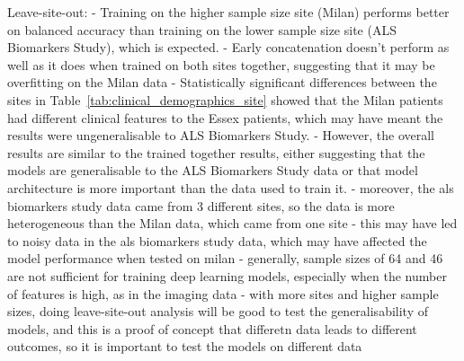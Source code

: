 



Leave-site-out:
- Training on the higher sample size site (Milan) performs better on balanced accuracy than training on the lower sample size site (ALS Biomarkers Study), which is expected.
- Early concatenation doesn't perform as well as it does when trained on both sites together, suggesting that it may be overfitting on the Milan data
- Statistically significant differences between the sites in Table~\ref{tab:clinical_demographics_site} showed that the Milan patients had different clinical features to the Essex patients, which may have meant the results were ungeneralisable to ALS Biomarkers Study.
- However, the overall results are similar to the trained together results, either suggesting that the models are generalisable to the ALS Biomarkers Study data or that model architecture is more important than the data used to train it.
- moreover, the als biomarkers study data came from 3 different sites, so the data is more heterogeneous than the Milan data, which came from one site
- this may have led to noisy data in the als biomarkers study data, which may have affected the model performance when tested on milan
- generally, sample sizes of 64 and 46 are not sufficient for training deep learning models, especially when the number of features is high, as in the imaging data
- with more sites and higher sample sizes, doing leave-site-out analysis will be good to test the generalisability of models, and this is a proof of concept that differetn data leads to different outcomes, so it is important to test the models on different data

